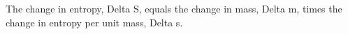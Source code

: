 The change in entropy, Delta S, equals the change in mass, Delta m, times the change in entropy per unit mass, Delta s.
